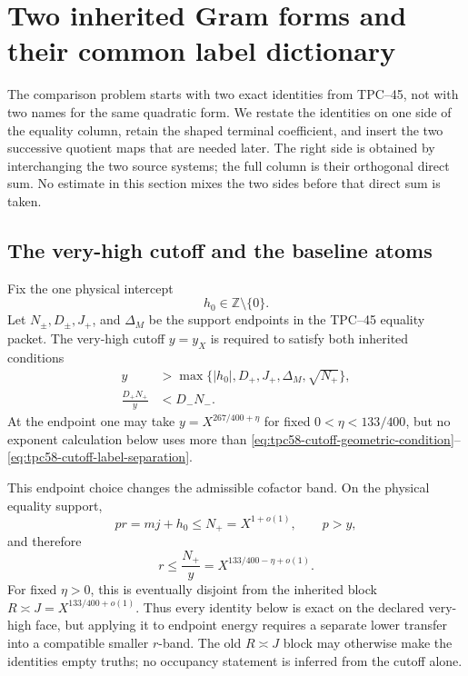 \section{Two inherited Gram forms and their common label dictionary}
\label{sec:tpc58-two-gram-dictionary}

The comparison problem starts with two exact identities from TPC--45,
not with two names for the same quadratic form.  We restate the identities
on one side of the equality column, retain the shaped terminal coefficient,
and insert the two successive quotient maps that are needed later.  The
right side is obtained by interchanging the two source systems; the full
column is their orthogonal direct sum.  No estimate in this section mixes
the two sides before that direct sum is taken.

\subsection{The very-high cutoff and the baseline atoms}

Fix the one physical intercept
\begin{equation}
 h_0\in\mathbb Z\setminus\{0\}.
 \label{eq:tpc58-fixed-intercept-dictionary}
\end{equation}
Let \(N_\pm,D_\pm,J_+\), and \(\Delta_M\) be the support endpoints in the
TPC--45 equality packet.  The very-high cutoff \(y=y_X\) is required to
satisfy both inherited conditions
\begin{align}
 y&>\max\{|h_0|,D_+,J_+,\Delta_M,\sqrt{N_+}\},
 \label{eq:tpc58-cutoff-geometric-condition}\\
 \frac{D_+N_+}{y}&<D_-N_-.
 \label{eq:tpc58-cutoff-label-separation}
\end{align}
At the endpoint one may take \(y=X^{267/400+\eta}\) for fixed
\(0<\eta<133/400\), but no exponent calculation below uses more than
\eqref{eq:tpc58-cutoff-geometric-condition}--
\eqref{eq:tpc58-cutoff-label-separation}.

This endpoint choice changes the admissible cofactor band.  On the physical
equality support,
\begin{equation}
 pr=mj+h_0\le N_+=X^{1+o(1)},
 \qquad p>y,
 \label{eq:tpc58-endpoint-product-ceiling}
\end{equation}
and therefore
\begin{equation}
 \boxed{r\le \frac{N_+}{y}
 =X^{133/400-\eta+o(1)}.}
 \label{eq:tpc58-compatible-cofactor-ceiling}
\end{equation}
For fixed \(\eta>0\), this is eventually disjoint from the inherited block
\(R\asymp J=X^{133/400+o(1)}\).  Thus every identity below is exact on the
declared very-high face, but applying it to endpoint energy requires a
separate lower transfer into a compatible smaller \(r\)-band.  The old
\(R\asymp J\) block may otherwise make the identities empty truths; no
occupancy statement is inferred from the cutoff alone.

